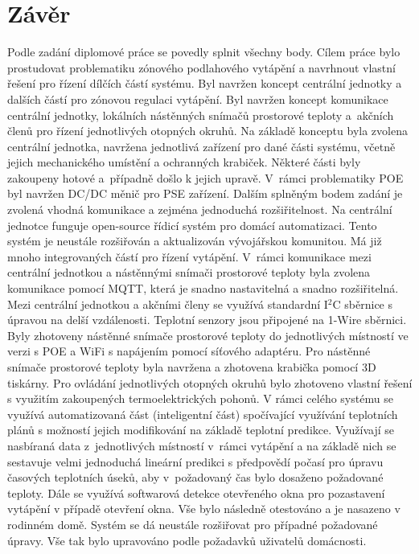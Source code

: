 \chapter{Závěr}
Podle zadání diplomové práce se povedly splnit všechny body. Cílem práce bylo prostudovat problematiku zónového podlahového vytápění a navrhnout vlastní řešení pro řízení dílčích částí systému. Byl navržen koncept centrální jednotky a dalších částí pro zónovou regulaci vytápění. Byl navržen koncept komunikace centrální jednotky, lokálních nástěnných snímačů prostorové teploty a~akčních členů pro řízení jednotlivých otopných okruhů. Na základě konceptu byla zvolena centrální jednotka, navržena jednotlivá zařízení pro dané části systému, včetně jejich mechanického umístění a ochranných krabiček. Některé části byly zakoupeny hotové a~případně došlo k jejich upravě. V~rámci problematiky POE byl navržen DC/DC měnič pro PSE zařízení. Dalším splněným bodem zadání je zvolená vhodná komunikace a zejména jednoduchá rozšiřitelnost. Na centrální jednotce funguje open-source řídicí systém pro domácí automatizaci. Tento systém je neustále rozšiřován a aktualizován vývojářskou komunitou. Má již mnoho integrovaných částí pro řízení vytápění. V~rámci komunikace mezi centrální jednotkou a nástěnnými snímači prostorové teploty byla zvolena komunikace pomocí MQTT, která je snadno nastavitelná a snadno rozšiřitelná. Mezi centrální jednotkou a akčními členy se využívá standardní I$^2$C sběrnice s úpravou na delší vzdálenosti. Teplotní senzory jsou připojené na 1-Wire sběrnici. Byly zhotoveny nástěnné snímače prostorové teploty do jednotlivých místností ve verzi s POE a WiFi s napájením pomocí síťového adaptéru. Pro nástěnné snímače prostorové teploty byla navržena a zhotovena krabička pomocí 3D tiskárny. Pro ovládání jednotlivých otopných okruhů bylo zhotoveno vlastní řešení s využitím zakoupených termoelektrických pohonů. V rámci celého systému se využívá automatizovaná část (inteligentní část) spočívající využívání teplotních plánů s možností jejich modifikování na základě teplotní predikce. Využívají se nasbíraná data z~jednotlivých místností v~rámci vytápění a na základě nich se sestavuje velmi jednoduchá lineární predikci s předpovědí počasí pro úpravu časových teplotních úseků, aby v~požadovaný čas bylo dosaženo požadované teploty. Dále se využívá softwarová detekce otevřeného okna pro pozastavení vytápění v případě otevření okna. Vše bylo následně otestováno a je nasazeno v rodinném domě. Systém se dá neustále rozšiřovat pro případné požadované úpravy. Vše tak bylo upravováno podle požadavků uživatelů domácnosti. 

